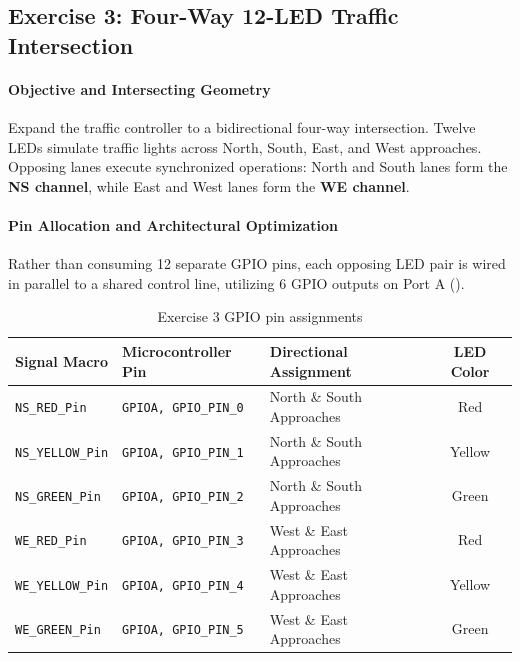 \documentclass[oneside,final]{hcmut-report}
\begin{document}
\subsection{Exercise 3: Four-Way 12-LED Traffic Intersection}
\label{subsec:ex3}
\enlargethispage{2.5\baselineskip}
\paragraph{Objective and Intersecting Geometry}
Expand the traffic controller to a bidirectional four-way intersection. Twelve LEDs simulate traffic lights across North, South, East, and West approaches. Opposing lanes execute synchronized operations: North and South lanes form the \textbf{NS channel}, while East and West lanes form the \textbf{WE channel}.

\paragraph{Pin Allocation and Architectural Optimization}
Rather than consuming 12 separate GPIO pins, each opposing LED pair is wired in parallel to a shared control line, utilizing 6 GPIO outputs on Port A ().

\begin{table}[H]
  \centering
  \footnotesize
  \begin{tabularx}{\linewidth}{l l l c}
    \toprule
    \textbf{Signal Macro} & \textbf{Microcontroller Pin} & \textbf{Directional Assignment} & \textbf{LED Color} \\
    \midrule
    \texttt{NS\_RED\_Pin} & \texttt{GPIOA, GPIO\_PIN\_0} & North \& South Approaches & Red \\
    \texttt{NS\_YELLOW\_Pin} & \texttt{GPIOA, GPIO\_PIN\_1} & North \& South Approaches & Yellow \\
    \texttt{NS\_GREEN\_Pin} & \texttt{GPIOA, GPIO\_PIN\_2} & North \& South Approaches & Green \\
    \texttt{WE\_RED\_Pin} & \texttt{GPIOA, GPIO\_PIN\_3} & West \& East Approaches & Red \\
    \texttt{WE\_YELLOW\_Pin} & \texttt{GPIOA, GPIO\_PIN\_4} & West \& East Approaches & Yellow \\
    \texttt{WE\_GREEN\_Pin} & \texttt{GPIOA, GPIO\_PIN\_5} & West \& East Approaches & Green \\
    \bottomrule
  \end{tabularx}
  \caption{Exercise 3 GPIO pin assignments}
  \label{tab:ex3_pins}
\end{table}
\end{document}
